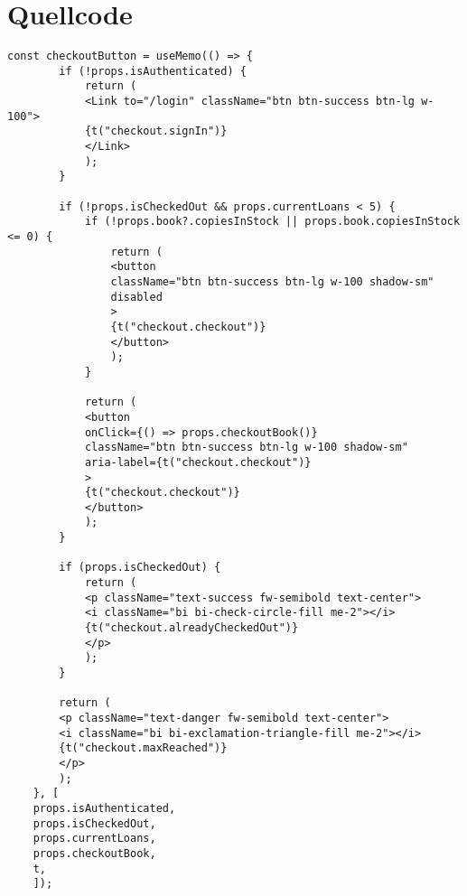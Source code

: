 \chapter{Quellcode}


\begin{lstlisting}[style=pseudocode, caption=Prozess des Auscheckens eines Buches im Frontend, label=renderButton(), breaklines=true]
	const checkoutButton = useMemo(() => {
		if (!props.isAuthenticated) {
			return (
			<Link to="/login" className="btn btn-success btn-lg w-100">
			{t("checkout.signIn")}
			</Link>
			);
		}
		
		if (!props.isCheckedOut && props.currentLoans < 5) {
			if (!props.book?.copiesInStock || props.book.copiesInStock <= 0) {
				return (
				<button
				className="btn btn-success btn-lg w-100 shadow-sm"
				disabled
				>
				{t("checkout.checkout")}
				</button>
				);
			}
			
			return (
			<button
			onClick={() => props.checkoutBook()}
			className="btn btn-success btn-lg w-100 shadow-sm"
			aria-label={t("checkout.checkout")}
			>
			{t("checkout.checkout")}
			</button>
			);
		}
		
		if (props.isCheckedOut) {
			return (
			<p className="text-success fw-semibold text-center">
			<i className="bi bi-check-circle-fill me-2"></i>
			{t("checkout.alreadyCheckedOut")}
			</p>
			);
		}
		
		return (
		<p className="text-danger fw-semibold text-center">
		<i className="bi bi-exclamation-triangle-fill me-2"></i>
		{t("checkout.maxReached")}
		</p>
		);
	}, [
	props.isAuthenticated,
	props.isCheckedOut,
	props.currentLoans,
	props.checkoutBook,
	t,
	]);
\end{lstlisting}







